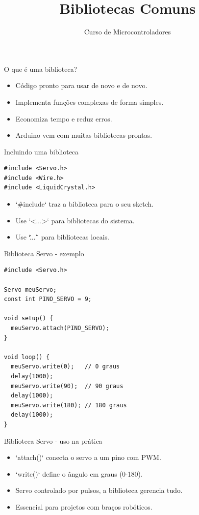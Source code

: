 \documentclass[10pt]{beamer}
\title{Bibliotecas Comuns}
\subtitle{Curso de Microcontroladores}
\author{}
\date{}
\begin{document}
\begin{frame}
  \titlepage
\end{frame}

\begin{frame}{O que é uma biblioteca?}
  \begin{itemize}
    \item Código pronto para usar de novo e de novo.
    \item Implementa funções complexas de forma simples.
    \item Economiza tempo e reduz erros.
    \item Arduino vem com muitas bibliotecas prontas.
  \end{itemize}
\end{frame}

\begin{frame}[fragile]{Incluindo uma biblioteca}
\begin{lstlisting}
#include <Servo.h>
#include <Wire.h>
#include <LiquidCrystal.h>
\end{lstlisting}

  \begin{itemize}
    \item `#include` traz a biblioteca para o seu sketch.
    \item Use `<...>` para bibliotecas do sistema.
    \item Use `\"...\"` para bibliotecas locais.
  \end{itemize}
\end{frame}

\begin{frame}[fragile]{Biblioteca Servo - exemplo}
\begin{lstlisting}
#include <Servo.h>

Servo meuServo;
const int PINO_SERVO = 9;

void setup() {
  meuServo.attach(PINO_SERVO);
}

void loop() {
  meuServo.write(0);   // 0 graus
  delay(1000);
  meuServo.write(90);  // 90 graus
  delay(1000);
  meuServo.write(180); // 180 graus
  delay(1000);
}
\end{lstlisting}
\end{frame}

\begin{frame}{Biblioteca Servo - uso na prática}
  \begin{itemize}
    \item `attach()` conecta o servo a um pino com PWM.
    \item `write()` define o ângulo em graus (0-180).
    \item Servo controlado por pulsos, a biblioteca gerencia tudo.
    \item Essencial para projetos com braços robóticos.
  \end{itemize}
\end{frame}
\end{document}
